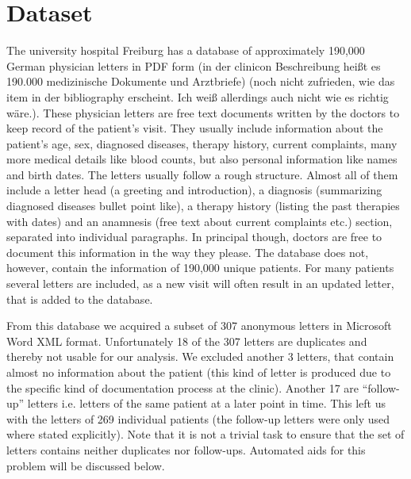 \documentclass[Thesis.tex]{subfiles}
\begin{document}
\chapter{Dataset}
\label{ch:dataset}

The university hospital Freiburg has a database of approximately 190,000 German
physician letters in PDF form \citep{spadaro2012} (in der clinicon Beschreibung heißt es 190.000 medizinische Dokumente und Arztbriefe) (noch nicht zufrieden, wie das item in der bibliography erscheint. Ich weiß allerdings auch nicht wie es richtig wäre.). These physician letters are free text documents
written by the doctors to keep record of the patient's visit. They
usually include information about the patient's age, sex, diagnosed
diseases, therapy history, current complaints, many more medical details
like blood counts, but also personal information like names and birth dates.
The letters usually follow a rough structure. Almost all of them include a letter head (a greeting and introduction), a diagnosis (summarizing diagnosed diseases bullet point like), a therapy history (listing the past therapies with dates) and an anamnesis (free text about current complaints etc.) section, separated into individual paragraphs. In principal though, doctors are free to document this information in the way they please.
The database does not, however, contain the information of 190,000 unique patients. For many patients several letters are included, as a new visit will often result in an updated letter, that is added to the database.

From this database we acquired a subset of 307 anonymous letters %
in Microsoft Word XML format. %
Unfortunately 18 of the 307 letters are duplicates and thereby not usable for our
analysis. We excluded another 3 letters, that contain almost no information
about the patient (this kind of letter is produced due to the specific
kind of documentation process at the clinic). Another 17 are ``follow-up''
letters i.e. letters of the same patient at a later point in time.
This left us with the letters of 269 individual patients (the follow-up
letters were only used where stated explicitly). Note that it is not
a trivial task to ensure that the set of letters contains neither
duplicates nor follow-ups. Automated aids for this problem will be
discussed below.
\end{document}
